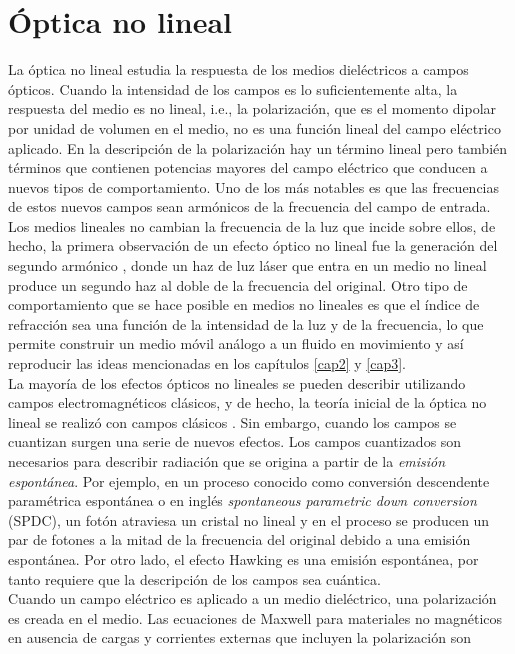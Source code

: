 \section{\'{O}ptica no lineal}
La \'{o}ptica no lineal estudia la respuesta de los medios dieléctricos a campos ópticos. Cuando la intensidad de los campos es lo suficientemente alta, la respuesta del medio es no lineal, i.e., la polarización, que es el momento dipolar por unidad de volumen en el medio, no es una función lineal del campo eléctrico aplicado. En la descripci\'{o}n de la polarización hay un término lineal pero tambi\'{e}n términos que contienen  potencias mayores del campo eléctrico que conducen a nuevos tipos de comportamiento. Uno de los más notables es que las frecuencias de estos nuevos campos sean arm\'{o}nicos de la frecuencia del campo de entrada. Los medios lineales no cambian la frecuencia de la luz que incide sobre ellos, de hecho, la primera observación de un efecto óptico no lineal fue la generación del segundo armónico \citep{franken1961generation}, donde un haz de luz láser que entra en un medio no lineal produce un segundo haz al doble de la frecuencia del original. Otro tipo de comportamiento que se hace posible en medios no lineales es que el índice de refracción sea una función de la intensidad de la luz y de la frecuencia, lo que permite construir un medio m\'{o}vil an\'{a}logo a un fluido en movimiento y as\'{i} reproducir las ideas mencionadas en los cap\'{i}tulos \ref{cap2} y \ref{cap3}.\\

La mayoría de los efectos ópticos no lineales se pueden describir utilizando campos electromagnéticos clásicos, y
de hecho, la teoría inicial de la óptica no lineal se realizó con campos clásicos \citep{armstrong1962interactions}. Sin embargo, cuando los campos se cuantizan surgen una serie de nuevos efectos. Los campos cuantizados son necesarios para describir radiaci\'{o}n que se origina a partir de la \textit{emisión espontánea}. Por ejemplo, en un proceso conocido como conversión descendente paramétrica espontánea o en ingl\'{e}s \textit{spontaneous parametric down conversion} (SPDC), un fot\'{o}n atraviesa un cristal no lineal y en el proceso se producen un par de fotones a la mitad de la frecuencia del original debido a una emisión espontánea. Por otro lado, el efecto Hawking es una emisi\'{o}n espont\'{a}nea, por tanto requiere que la descripci\'{o}n de los campos sea cu\'{a}ntica.\\

Cuando un campo el\'{e}ctrico es aplicado a un medio diel\'{e}ctrico, una polarizaci\'{o}n es creada en el medio. Las ecuaciones de Maxwell para materiales no magn\'{e}ticos en ausencia de cargas y corrientes externas que incluyen la polarizaci\'{o}n son

